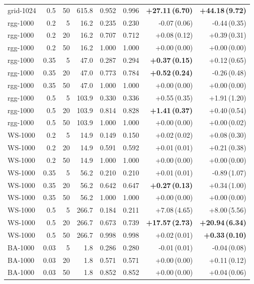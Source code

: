 \documentclass[ASNA,number]{USG}
\begin{document}
\begin{table}[h]
\begin{tabular}{lrrrrrrr}
grid-1024 & 0.5 & 50 & 615.8 & 0.952 & 0.996 & \textbf{+27.11\,(6.70)} & \textbf{+44.18\,(9.72)} \\
rgg-1000 & 0.2 & 5 & 16.2 & 0.235 & 0.230 & -0.07\,(0.06) & -0.44\,(0.35) \\
rgg-1000 & 0.2 & 20 & 16.2 & 0.707 & 0.712 & +0.08\,(0.12) & +0.39\,(0.31) \\
rgg-1000 & 0.2 & 50 & 16.2 & 1.000 & 1.000 & +0.00\,(0.00) & +0.00\,(0.00) \\
rgg-1000 & 0.35 & 5 & 47.0 & 0.287 & 0.294 & \textbf{+0.37\,(0.15)} & +0.12\,(0.65) \\
rgg-1000 & 0.35 & 20 & 47.0 & 0.773 & 0.784 & \textbf{+0.52\,(0.24)} & -0.26\,(0.48) \\
rgg-1000 & 0.35 & 50 & 47.0 & 1.000 & 1.000 & +0.00\,(0.00) & +0.00\,(0.00) \\
rgg-1000 & 0.5 & 5 & 103.9 & 0.330 & 0.336 & +0.55\,(0.35) & +1.91\,(1.20) \\
rgg-1000 & 0.5 & 20 & 103.9 & 0.814 & 0.828 & \textbf{+1.41\,(0.37)} & +0.40\,(0.54) \\
rgg-1000 & 0.5 & 50 & 103.9 & 1.000 & 1.000 & +0.00\,(0.00) & +0.00\,(0.02) \\
WS-1000 & 0.2 & 5 & 14.9 & 0.149 & 0.150 & +0.02\,(0.02) & +0.08\,(0.30) \\
WS-1000 & 0.2 & 20 & 14.9 & 0.591 & 0.592 & +0.01\,(0.01) & +0.21\,(0.38) \\
WS-1000 & 0.2 & 50 & 14.9 & 1.000 & 1.000 & +0.00\,(0.00) & +0.00\,(0.00) \\
WS-1000 & 0.35 & 5 & 56.2 & 0.210 & 0.210 & +0.01\,(0.01) & -0.89\,(1.07) \\
WS-1000 & 0.35 & 20 & 56.2 & 0.642 & 0.647 & \textbf{+0.27\,(0.13)} & +0.34\,(1.00) \\
WS-1000 & 0.35 & 50 & 56.2 & 1.000 & 1.000 & +0.00\,(0.00) & +0.00\,(0.00) \\
WS-1000 & 0.5 & 5 & 266.7 & 0.184 & 0.211 & +7.08\,(4.65) & +8.00\,(5.56) \\
WS-1000 & 0.5 & 20 & 266.7 & 0.673 & 0.739 & \textbf{+17.57\,(2.73)} & \textbf{+20.94\,(6.34)} \\
WS-1000 & 0.5 & 50 & 266.7 & 0.998 & 0.998 & +0.02\,(0.01) & \textbf{+0.33\,(0.10)} \\
BA-1000 & 0.03 & 5 & 1.8 & 0.286 & 0.280 & -0.01\,(0.01) & -0.04\,(0.08) \\
BA-1000 & 0.03 & 20 & 1.8 & 0.571 & 0.571 & +0.00\,(0.00) & +0.11\,(0.12) \\
BA-1000 & 0.03 & 50 & 1.8 & 0.852 & 0.852 & +0.00\,(0.00) & +0.04\,(0.06) \\

\end{tabular}
\end{table}
\end{document}
